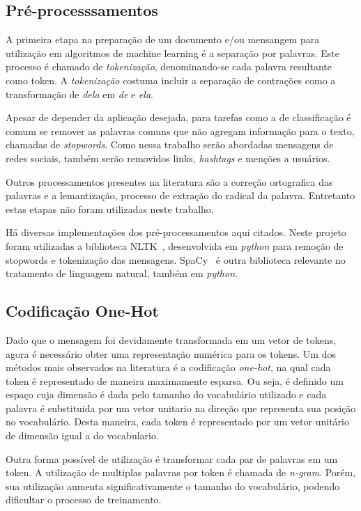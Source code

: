 
\subsection{Pré-processsamentos}

A primeira etapa na preparação de um documento e/ou mensangem para utilização em algoritmos de machine learning é a
separação por palavras.
Este processo é chamado de \textit{tokenização}, denominando-se cada palavra resultante como token.
A \textit{tokenização} costuma incluir a separação de contrações como a transformação de \textit{dela} em \textit{de}
e \textit{ela}.

Apesar de depender da aplicação desejada, para tarefas como a de classificação é comum se remover as palavras comuns que
não agregam informação para o texto, chamadas de \textit{stopwords}.
Como nessa trabalho serão abordadas mensagens de redes sociais, também serão removidos links, \textit{hashtags} e menções
a usuários.

Outros processamentos presentes na literatura são a correção ortografica das palavras e a lemantização, processo de
extração do radical da palavra.
Entretanto estas etapas não foram utilizadas neste trabalho.

Há diversas implementações dos pré-processamentos aqui citados. Neste projeto foram utilizadas a biblioteca
NLTK~\cite{nltk}, desenvolvida em \textit{python} para remoção de stopwords e tokenização das mensagens.
SpaCy~\cite{spacy} é outra biblioteca relevante no tratamento de linguagem natural, também em \textit{python}.

\subsection{Codificação One-Hot}

Dado que o mensagem foi devidamente transformada em um vetor de tokens, agora é necessário obter uma representação
numérica para os tokens.
Um dos métodos mais observados na literatura é a codificação \textit{one-hot}, na qual cada token é representado de
maneira maximamente esparsa.
Ou seja, é definido um espaço cuja dimensão é dada pelo tamanho do vocabulário utilizado e cada palavra é substituida
por um vetor unitario na direção que representa sua posição no vocabulário.
Desta maneira, cada token é representado por um vetor unitário de dimensão igual a do vocabulario.

Outra forma possível de utilização é transformar cada par de palavras em um token.
A utilização de multiplas palavras por token é chamada de \textit{n-gram}.
Porém, sua utilização aumenta significativamente o tamanho do vocabulário, podendo dificultar o processo de treinamento.

